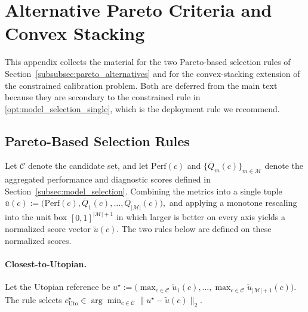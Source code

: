 \documentclass{article}
\theoremstyle{plain}
\theoremstyle{definition}
\newtheorem{remark}{Remark}
\newcommand{\1}{\mathbf{1}}
\begin{document}




\section{Alternative Pareto Criteria and Convex Stacking}
\label{app:pareto_and_stacking}

This appendix collects the material for the two Pareto-based selection rules of Section~\ref{subsubsec:pareto_alternatives} and for the convex-stacking extension of the constrained calibration problem. Both are deferred from the main text because they are secondary to the constrained rule in \eqref{opt:model_selection_single}, which is the deployment rule we recommend.

\subsection{Pareto-Based Selection Rules}
\label{app:pareto_rules}

Let $\mathcal C$ denote the candidate set, and let $\bar{\mathrm{Perf}}(c)$ and $\{\bar Q_m(c)\}_{m\in\mathcal M}$ denote the aggregated performance and diagnostic scores defined in Section~\ref{subsec:model_selection}. Combining the metrics into a single tuple
$
\bar u(c):=\bigl(\bar{\mathrm{Perf}}(c),\bar Q_1(c),\dots,\bar Q_{|\mathcal M|}(c)\bigr),
$
and applying a monotone rescaling into the unit box $[0,1]^{|\mathcal M|+1}$ in which larger is better on every axis yields a normalized score vector $\tilde u(c)$. The two rules below are defined on these normalized scores.

\paragraph{Closest-to-Utopian.}
Let the Utopian reference be
$
u^\star := \big(\max_{c\in\mathcal C}\tilde u_1(c),\dots,\max_{c\in\mathcal C}\tilde u_{|\mathcal M|+1}(c)\big).
$
The rule selects
$
c^\star_{\text{Uto}} \in \arg\min_{c\in\mathcal C} \lVert u^\star - \tilde u(c)\rVert_2.
$
\end{document}
